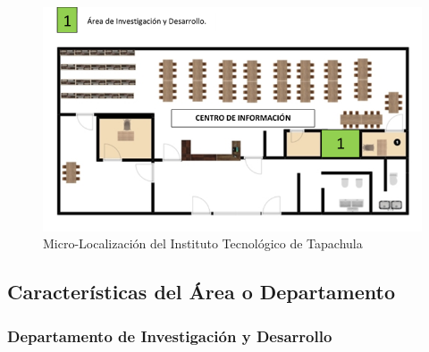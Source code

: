 \begin{figure}[!hb]
\centering
\includegraphics[scale=0.8]{sources/microlocalizacion.png}
\caption{Micro-Localización del Instituto Tecnológico de Tapachula}\label{fig:microloc}
\end{figure}

\subsection*{Características del Área o Departamento}

\subsubsection*{Departamento de Investigación y Desarrollo}

